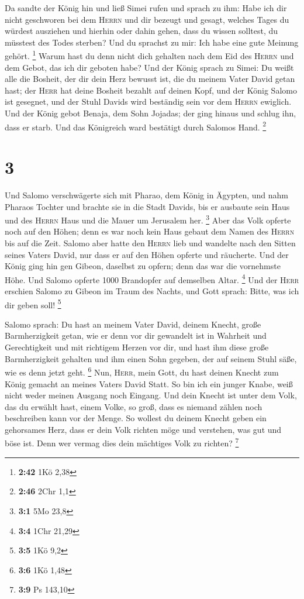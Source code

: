  Da sandte der König hin und ließ Simei rufen und sprach
zu ihm: Habe ich dir nicht geschworen bei dem \textsc{Herrn} und dir
bezeugt und gesagt, welches Tages du würdest ausziehen und hierhin oder
dahin gehen, dass du wissen solltest, du müsstest des Todes sterben? Und
du sprachst zu mir: Ich habe eine gute Meinung gehört. \footnote{\textbf{2:42}
  1Kö 2,38}  Warum hast du denn nicht dich gehalten nach
dem Eid des \textsc{Herrn} und dem Gebot, das ich dir geboten habe?
 Und der König sprach zu Simei: Du weißt alle die
Bosheit, der dir dein Herz bewusst ist, die du meinem Vater David getan
hast; der \textsc{Herr} hat deine Bosheit bezahlt auf deinen Kopf,
 und der König Salomo ist gesegnet, und der Stuhl Davids
wird beständig sein vor dem \textsc{Herrn} ewiglich.  Und
der König gebot Benaja, dem Sohn Jojadas; der ging hinaus und schlug
ihn, dass er starb. Und das Königreich ward bestätigt durch Salomos
Hand. \footnote{\textbf{2:46} 2Chr 1,1}

\hypertarget{section-1}{%
\section{3}\label{section-1}}

 Und Salomo verschwägerte sich mit Pharao, dem König in
Ägypten, und nahm Pharaos Tochter und brachte sie in die Stadt Davids,
bis er ausbaute sein Haus und des \textsc{Herrn} Haus und die Mauer um
Jerusalem her. \footnote{\textbf{3:1} 5Mo 23,8}  Aber das
Volk opferte noch auf den Höhen; denn es war noch kein Haus gebaut dem
Namen des \textsc{Herrn} bis auf die Zeit.  Salomo aber
hatte den \textsc{Herrn} lieb und wandelte nach den Sitten seines Vaters
David, nur dass er auf den Höhen opferte und räucherte. 
Und der König ging hin gen Gibeon, daselbst zu opfern; denn das war die
vornehmste Höhe. Und Salomo opferte 1000 Brandopfer auf demselben Altar.
\footnote{\textbf{3:4} 1Chr 21,29}  Und der \textsc{Herr}
erschien Salomo zu Gibeon im Traum des Nachts, und Gott sprach: Bitte,
was ich dir geben soll! \footnote{\textbf{3:5} 1Kö 9,2}

 Salomo sprach: Du hast an meinem Vater David, deinem
Knecht, große Barmherzigkeit getan, wie er denn vor dir gewandelt ist in
Wahrheit und Gerechtigkeit und mit richtigem Herzen vor dir, und hast
ihm diese große Barmherzigkeit gehalten und ihm einen Sohn gegeben, der
auf seinem Stuhl säße, wie es denn jetzt geht. \footnote{\textbf{3:6}
  1Kö 1,48}  Nun, \textsc{Herr}, mein Gott, du hast deinen
Knecht zum König gemacht an meines Vaters David Statt. So bin ich ein
junger Knabe, weiß nicht weder meinen Ausgang noch Eingang.
 Und dein Knecht ist unter dem Volk, das du erwählt hast,
einem Volke, so groß, dass es niemand zählen noch beschreiben kann vor
der Menge.  So wollest du deinem Knecht geben ein
gehorsames Herz, dass er dein Volk richten möge und verstehen, was gut
und böse ist. Denn wer vermag dies dein mächtiges Volk zu richten?
\footnote{\textbf{3:9} Ps 143,10}


